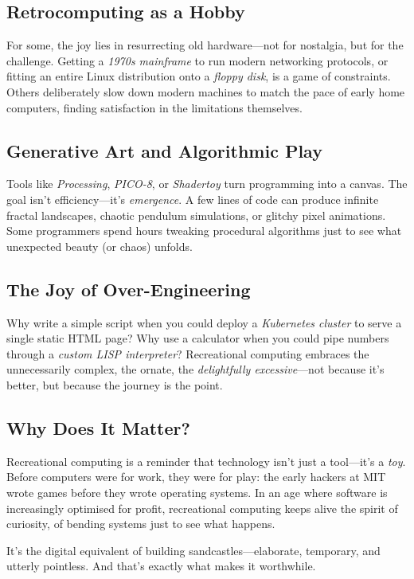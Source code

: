 \documentclass[12pt]{article}
\begin{document}
\subsection*{Retrocomputing as a Hobby}
For some, the joy lies in resurrecting old hardware---not for nostalgia, but for the challenge. Getting a \textit{1970s mainframe} to run modern networking protocols, or fitting an entire Linux distribution onto a \textit{floppy disk}, is a game of constraints. Others deliberately slow down modern machines to match the pace of early home computers, finding satisfaction in the limitations themselves.

\subsection*{Generative Art and Algorithmic Play}
Tools like \textit{Processing}, \textit{PICO-8}, or \textit{Shadertoy} turn programming into a canvas. The goal isn’t efficiency---it’s \emph{emergence}. A few lines of code can produce infinite fractal landscapes, chaotic pendulum simulations, or glitchy pixel animations. Some programmers spend hours tweaking procedural algorithms just to see what unexpected beauty (or chaos) unfolds.

\subsection*{The Joy of Over-Engineering}
Why write a simple script when you could deploy a \textit{Kubernetes cluster} to serve a single static HTML page? Why use a calculator when you could pipe numbers through a \textit{custom LISP interpreter}? Recreational computing embraces the unnecessarily complex, the ornate, the \emph{delightfully excessive}---not because it’s better, but because the journey is the point.

\subsection*{Why Does It Matter?}
Recreational computing is a reminder that technology isn’t just a tool---it’s a \textit{toy}. Before computers were for work, they were for play: the early hackers at MIT wrote games before they wrote operating systems. In an age where software is increasingly optimised for profit, recreational computing keeps alive the spirit of curiosity, of bending systems just to see what happens.

It’s the digital equivalent of building sandcastles---elaborate, temporary, and utterly pointless. And that’s exactly what makes it worthwhile.

\newpage
\printindex
\end{document}
